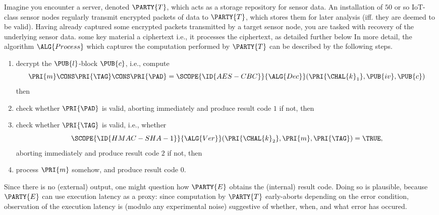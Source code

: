 %



Imagine you encounter a server, denoted 
$\PARTY{T}$, 
which acts as a storage repository for sensor data.  An installation of $50$ 
or so IoT-class sensor nodes regularly transmit encrypted packets of data to
$\PARTY{T}$, 
which stores them for later analysis (iff. they are deemed to be valid).  
Having already captured some encrypted packets transmitted by a target sensor
node, you are tasked with recovery of the underlying sensor data.
\DESCINTRO[none]
{}
{some key material}
{a ciphertext}
{i.e., it processes the ciphertext, as detailed further below}
{}
In more detail, the algorithm
$\ALG{Process}$
which captures the computation performed by
$\PARTY{T}$
can be described by the following steps.

\begin{enumerate}
\item decrypt the $\PUB{l}$-block $\PUB{c}$, i.e., compute
      \[
      \PRI{m} \CONS \PRI{\TAG} \CONS \PRI{\PAD} = \SCOPE{\ID{AES-CBC}}{\ALG{Dec}}( \PRI{\CHAL{k}_1}, \PUB{iv}, \PUB{c} )
      \]
      then
\item check whether $\PRI{\PAD}$ is valid, 
      aborting immediately  and produce result code $1$ if not,
      then
\item check whether $\PRI{\TAG}$ is valid, i.e., whether 
      \[
      \SCOPE{\ID{HMAC-SHA-1}}{\ALG{Ver}}( \PRI{\CHAL{k}_2}, \PRI{m}, \PRI{\TAG} ) = \TRUE ,
      \]
      aborting immediately  and produce result code $2$ if not,
      then
\item process $\PRI{m}$ somehow,
                            and produce result code $0$.
\end{enumerate}

\noindent
Since there is no (external) output, one might question how
$\PARTY{E}$
obtains the (internal) result code.  Doing so is plausible, because 
$\PARTY{E}$
can use execution latency as a proxy: since computation by
$\PARTY{T}$
early-aborts depending on the error condition, observation of the execution
latency is (modulo any experimental noise) suggestive of whether, when, and 
what error has occured.

